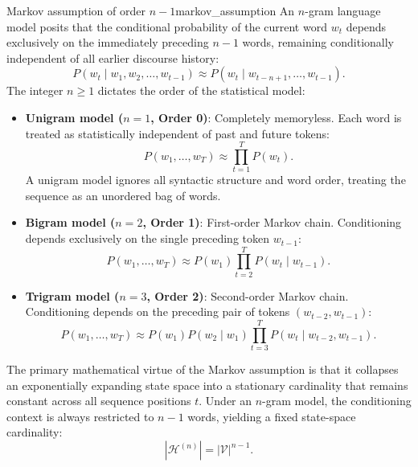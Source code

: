 \documentclass[../../../main.tex]{subfiles}
\begin{document}
\begin{definition}{Markov assumption of order $n-1$}{markov_assumption}
An $n$-gram language model posits that the conditional probability of the current word $w_t$ depends exclusively on the immediately preceding $n-1$ words, remaining conditionally independent of all earlier discourse history:
\begin{equation}
P\left(w_t \mid w_1, w_2, \dots, w_{t-1}\right) \approx P\left(w_t \mid w_{t-n+1}, \dots, w_{t-1}\right).
\label{eq:markov_assumption}
\end{equation}
The integer $n \ge 1$ dictates the order of the statistical model:
\begin{itemize}
    \item \textbf{Unigram model ($n=1$, Order 0)}: Completely memoryless. Each word is treated as statistically independent of past and future tokens:
    \begin{equation}
    P\left(w_1, \dots, w_T\right) \approx \prod_{t=1}^T P\left(w_t\right).
    \end{equation}
    A unigram model ignores all syntactic structure and word order, treating the sequence as an unordered bag of words.
    \item \textbf{Bigram model ($n=2$, Order 1)}: First-order Markov chain. Conditioning depends exclusively on the single preceding token $w_{t-1}$:
    \begin{equation}
    P\left(w_1, \dots, w_T\right) \approx P\left(w_1\right) \prod_{t=2}^T P\left(w_t \mid w_{t-1}\right).
    \label{eq:bigram_joint_approximation}
    \end{equation}
    \item \textbf{Trigram model ($n=3$, Order 2)}: Second-order Markov chain. Conditioning depends on the preceding pair of tokens $(w_{t-2}, w_{t-1})$:
    \begin{equation}
    P\left(w_1, \dots, w_T\right) \approx P\left(w_1\right) P\left(w_2 \mid w_1\right) \prod_{t=3}^T P\left(w_t \mid w_{t-2}, w_{t-1}\right).
    \end{equation}
\end{itemize}
\end{definition}

The primary mathematical virtue of the Markov assumption is that it collapses an exponentially expanding state space into a stationary cardinality that remains constant across all sequence positions $t$. Under an $n$-gram model, the conditioning context is always restricted to $n-1$ words, yielding a fixed state-space cardinality:
\begin{equation}
|\mathcal{H}^{(n)}| = |\mathcal{V}|^{n-1}.
\label{eq:state_space_markov}
\end{equation}
\end{document}
